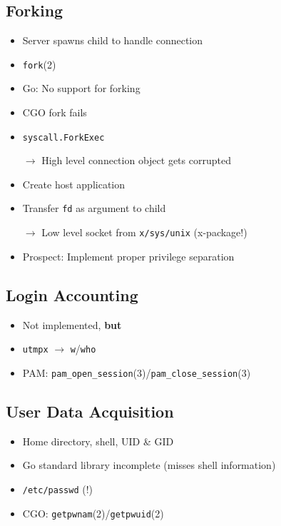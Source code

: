 \documentclass[
	xcolor=dvipsnames,
]{beamer}
\newenvironment{zhawframe}[1][]
{\begin{frame}[environment=fr,#1]{\insertsectionhead}{\insertsubsectionhead}}
{\end{frame}
}
\begin{document}
\subsection{Forking}
\begin{zhawframe}
\begin{itemize}
\item<1-> Server spawns child to handle connection
\item<2-> \texttt{fork}(2)
\item<3-> Go: No support for forking
\item<4-> CGO fork fails
\item<5-> \texttt{syscall.ForkExec}

$\rightarrow$ High level connection object gets corrupted
\item<7-> Create host application
\item<8-> Transfer \texttt{fd} as argument to child

$\rightarrow$ Low level socket from \texttt{x/sys/unix} (x-package!)
\item<10-> Prospect: Implement proper privilege separation
\end{itemize}
\end{zhawframe}

\subsection{Login Accounting}
\begin{zhawframe}
\begin{itemize}
\item<1-> Not implemented, \textbf{but}
\item<2-> \texttt{utmpx} $\rightarrow$ \texttt{w}/\texttt{who}
\item<3-> PAM: \texttt{pam\_{}open\_{}session}(3)/\texttt{pam\_{}close\_{}session}(3)
\end{itemize}
\end{zhawframe}

\subsection{User Data Acquisition}
\begin{zhawframe}
\begin{itemize}
\item<1-> Home directory, shell, UID \& GID
\item<2-> Go standard library incomplete (misses shell information)
\item<3-> \texttt{/etc/passwd} (!)
\item<4-> CGO: \texttt{getpwnam}(2)/\texttt{getpwuid}(2)
\end{itemize}
\end{zhawframe}
\end{document}

